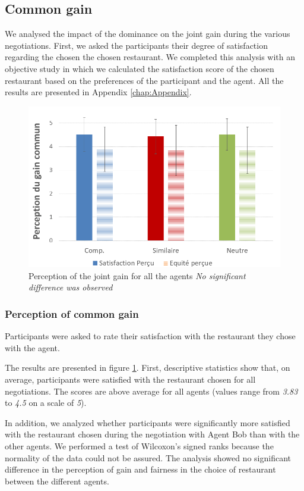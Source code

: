 \documentclass[10pt, a4paper, twocolumn]{article} %
\begin{document}
	\subsection{Common gain}
		We analysed the impact of the dominance on the joint gain during the various negotiations. First, we asked the participants their degree of satisfaction regarding the chosen the chosen restaurant. We completed this analysis with an objective study in which we calculated the satisfaction score of the chosen restaurant based on the preferences of the participant and the agent. All the results are presented in Appendix \ref{chap:Appendix}.
		
			\begin{figure}[h]
			
			\centering
			\includegraphics[width= 0.65 \linewidth,clip=false]{figs/percpGain.PNG}
			\caption{Perception of the joint gain for all the agents \textit{No significant difference was observed}}
			\label{fig:gainCom}
		\end{figure}
	
	\subsubsection{Perception of common gain}
	Participants were asked to rate their satisfaction with the restaurant they chose with the agent.
	
	The results are presented in figure \ref{fig:gainCom}. First, descriptive statistics show that, on average, participants were satisfied with the restaurant chosen for all negotiations. The scores are above average for all agents (values range from \emph{3.83} to \emph{4.5} on a scale of \emph{5}). 
	
	In addition, we analyzed whether participants were significantly more satisfied with the restaurant chosen during the negotiation with Agent Bob than with the other agents. We performed a test of Wilcoxon's signed ranks because the normality of the data could not be assured. The analysis showed no significant difference in the perception of gain and fairness in the choice of restaurant between the different agents. 
	
\end{document}
